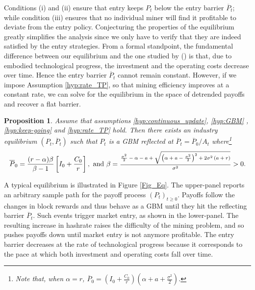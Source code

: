 \documentclass[12pt, a4paper]{article}
\newtheorem{prop}{Proposition}
\begin{document}
Conditions (i) and (ii) ensure that entry keeps $P_t$ below the entry barrier $\overline{P}_t$; while condition (iii) ensures that no individual miner will find it profitable to deviate from the entry policy.
Conjecturing the properties of the equilibrium greatly simplifies the analysis
since we only have to verify that they are indeed satisfied by the entry strategies. From a formal standpoint, the fundamental difference between our equilibrium
and the one studied by \citeauthor{CaballeroPyndick} (\citeyear{CaballeroPyndick}) is that, due to embodied technological progress,
the investment and the operating costs decrease over time. Hence the entry barrier $%
\overline{P}_{t}$ cannot remain constant. However, if we impose Assumption %
\ref{hyp:rate_TP}, so that mining efficiency improves at a constant rate, we
can solve for the equilibrium in the space of detrended payoffs and
recover a flat barrier.


\begin{prop}
\label{prop:industry-eq} Assume that assumptions \ref{hyp:continuous_update}, \ref{hyp:GBM}%
, \ref{hyp:keep-going} and \ref{hyp:rate_TP} hold. Then there
exists an industry equilibrium $\left(P_t,\overline{P}_t\right)$ such that $P_t$
is a GBM reflected at $\overline{P}_t=\overline{P}_0/A_t$ where\footnote{%
Note that, when $\alpha =r$, $\overline{P}_{0}=\left(I_{0}+\frac{C_0}{r}%
\right)\left( \alpha +a+\frac{\sigma ^{2}}{2}\right)$.}
\begin{equation}
\overline{P}_{0}=\frac{ (r-\alpha )\beta}{\beta -1}\left[I_{0}+\frac{C_0}{r}%
\right], \text{ and } \beta= \text{{\scriptsize $\frac{\frac{\sigma^2}{2}%
-\alpha -a+\sqrt{\left(\alpha +a-\frac{\sigma^2}{2}\right)^2+2\sigma^2%
\left(a+r\right)}}{\sigma^2}$}}>0.  \label{eq:def_barrier}
\end{equation}
\end{prop}

A typical equilibrium is illustrated in Figure \ref{Fig_Eq}. The upper-panel
reports an arbitrary sample path for the payoff process $(P_t)_{t\geq 0}$.
Payoffs follow the changes in block rewards and thus behave as a GBM
until they hit the reflecting barrier $\overline{P}_t$. Such events trigger
market entry, as shown in the lower-panel. The resulting increase in
hashrate raises the difficulty of the mining problem, and so pushes
payoffs down until market entry is not anymore profitable. The entry barrier
decreases at the rate of technological progress because it corresponds to
the pace at which both investment and operating costs fall over time.
\end{document}
